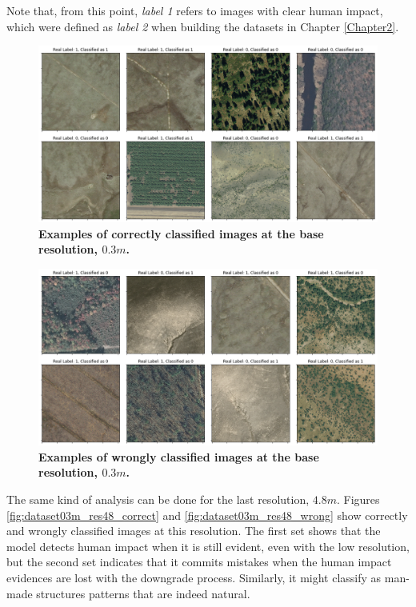 Note that, from this point, \textit{label 1} refers to images with clear human impact, which were defined as \textit{label 2} when building the datasets in Chapter \ref{Chapter2}.

\begin{figure}[H]
	\centering
	\captionsetup{width=1\linewidth}
	\includegraphics[width=1\textwidth]{Figures/results/class_dataset03m_res03_correct.png}
	\caption{\textbf{Examples of correctly classified images at the base resolution, $0.3m$.}}
	\label{fig:dataset03m_res03_correct}
\end{figure}

\begin{figure}[H]
	\centering
	\captionsetup{width=1\linewidth}
	\includegraphics[width=1\textwidth]{Figures/results/class_dataset03m_res03_wrong.png}
	\caption{\textbf{Examples of wrongly classified images at the base resolution,  $0.3m$.}}
	\label{fig:dataset03m_res03_wrong}
\end{figure}

The same kind of analysis can be done for the last resolution, $4.8m$. Figures \ref{fig:dataset03m_res48_correct} and \ref{fig:dataset03m_res48_wrong} show correctly and wrongly classified images at this resolution. The first set shows that the model detects human impact when it is still evident, even with the low resolution, but the second set indicates that it commits mistakes when the human impact evidences are lost with the downgrade process. Similarly, it might classify as man-made structures patterns that are indeed natural.

